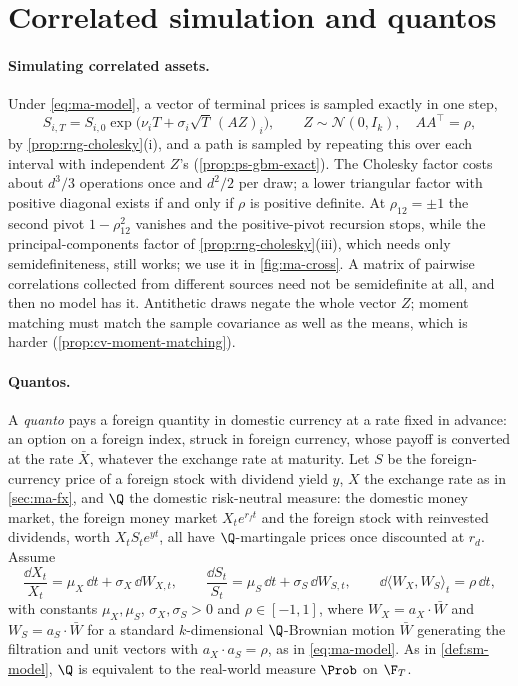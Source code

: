 \section{Correlated simulation and quantos}\label{sec:ma-quanto}

\paragraph{Simulating correlated assets.} Under \eqref{eq:ma-model}, a vector of terminal prices is
sampled exactly in one step,
\[
  S_{i,T}=S_{i,0}\exp\big(\nu_iT+\sigma_i\sqrt T\,(AZ)_i\big),\qquad Z\sim\mathcal N(0,I_k),\quad AA^\top=\rho,
\]
by \cref{prop:rng-cholesky}(i), and a path is sampled by repeating this over each interval with
independent $Z$'s (\cref{prop:ps-gbm-exact}). The Cholesky factor costs about $d^3/3$ operations
once and $d^2/2$ per draw; a lower triangular factor with positive diagonal exists if and only if
$\rho$ is positive definite. At
$\rho_{12}=\pm1$ the second pivot $1-\rho_{12}^2$ vanishes and the positive-pivot recursion stops, while the
principal-components factor of \cref{prop:rng-cholesky}(iii), which needs only semidefiniteness,
still works; we use it in \cref{fig:ma-cross}. A matrix of pairwise correlations collected from
different sources need not be semidefinite at all, and then no model has it. Antithetic draws
negate the whole vector $Z$; moment matching must match the sample covariance as well as the
means, which is harder (\cref{prop:cv-moment-matching}).

\paragraph{Quantos.} A \emph{quanto} pays a foreign quantity in domestic currency at a rate fixed in
advance: an option on a foreign index, struck in foreign currency, whose payoff is converted at the
rate $\bar X$, whatever the exchange rate at maturity. Let $S$ be the foreign-currency price of a
foreign stock with dividend yield $y$, $X$ the exchange rate as in \cref{sec:ma-fx}, and $\Q$ the
domestic risk-neutral measure: the domestic money market, the foreign money market $X_te^{r_ft}$
and the foreign stock with reinvested dividends, worth $X_tS_te^{yt}$, all have $\Q$-martingale
prices once discounted at $r_d$. Assume
\begin{equation}\label{eq:ma-quanto-model}
  \frac{\dd X_t}{X_t}=\mu_X\,\dd t+\sigma_X\,\dd W_{X,t},\qquad
  \frac{\dd S_t}{S_t}=\mu_S\,\dd t+\sigma_S\,\dd W_{S,t},\qquad
  \dd\langle W_X,W_S\rangle_t=\rho\,\dd t,
\end{equation}
with constants $\mu_X,\mu_S$, $\sigma_X,\sigma_S>0$ and $\rho\in[-1,1]$, where $W_X=a_X\cdot\bar W$ and
$W_S=a_S\cdot\bar W$ for a standard $k$-dimensional $\Q$-Brownian motion $\bar W$ generating the filtration
and unit vectors with $a_X\cdot a_S=\rho$, as in \eqref{eq:ma-model}. As in \cref{def:sm-model}, $\Q$ is
equivalent to the real-world measure $\Prob$ on $\F_T$.

